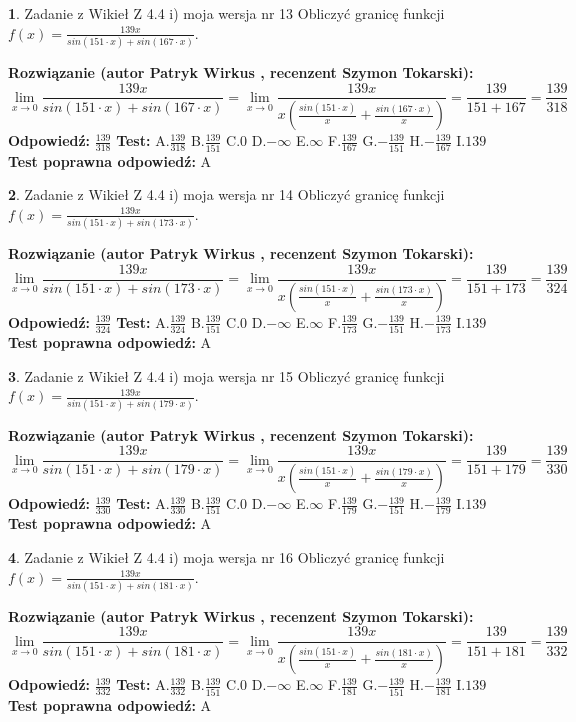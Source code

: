 \documentclass[12pt, a4paper]{article}
\theoremstyle{definition} %
\newtheorem{zad}{}
\newcommand{\zadStart}[1]{\begin{zad}#1\newline}
\newcommand{\zadStop}{\end{zad}}
\newcommand{\rozwStart}[2]{\noindent \textbf{Rozwiązanie (autor #1 , recenzent #2): }\newline}
\newcommand{\rozwStop}{\newline}
\newcommand{\odpStart}{\noindent \textbf{Odpowiedź:}\newline}
\newcommand{\odpStop}{\newline}
\newcommand{\testStart}{\noindent \textbf{Test:}\newline}
\newcommand{\testStop}{\newline}
\newcommand{\kluczStart}{\noindent \textbf{Test poprawna odpowiedź:}\newline}
\newcommand{\kluczStop}{\newline}
\begin{document}
\zadStart{Zadanie z Wikieł Z 4.4 i) moja wersja nr 13}
Obliczyć granicę funkcji $f(x)=\frac{139x}{sin(151\cdot x) +sin(167\cdot x)}$.
\zadStop
\rozwStart{Patryk Wirkus}{Szymon Tokarski}
$$\lim\limits_{x\to 0}\frac{139x}{sin(151\cdot x) +sin(167\cdot x)}=\lim\limits_{x\to 0}\frac{139x}{x(\frac{sin(151\cdot x)}{x}+\frac{sin(167\cdot x)}{x})}=\frac{139}{151+167} = \frac{139}{318}$$
\rozwStop
\odpStart
$\frac{139}{318}$
\odpStop
\testStart
A.$\frac{139}{318}$
B.$\frac{139}{151}$
C.$0$
D.$-\infty$
E.$\infty$
F.$\frac{139}{167}$
G.$-\frac{139}{151}$
H.$-\frac{139}{167}$
I.$139$
\testStop
\kluczStart
A
\kluczStop



\zadStart{Zadanie z Wikieł Z 4.4 i) moja wersja nr 14}
Obliczyć granicę funkcji $f(x)=\frac{139x}{sin(151\cdot x) +sin(173\cdot x)}$.
\zadStop
\rozwStart{Patryk Wirkus}{Szymon Tokarski}
$$\lim\limits_{x\to 0}\frac{139x}{sin(151\cdot x) +sin(173\cdot x)}=\lim\limits_{x\to 0}\frac{139x}{x(\frac{sin(151\cdot x)}{x}+\frac{sin(173\cdot x)}{x})}=\frac{139}{151+173} = \frac{139}{324}$$
\rozwStop
\odpStart
$\frac{139}{324}$
\odpStop
\testStart
A.$\frac{139}{324}$
B.$\frac{139}{151}$
C.$0$
D.$-\infty$
E.$\infty$
F.$\frac{139}{173}$
G.$-\frac{139}{151}$
H.$-\frac{139}{173}$
I.$139$
\testStop
\kluczStart
A
\kluczStop



\zadStart{Zadanie z Wikieł Z 4.4 i) moja wersja nr 15}
Obliczyć granicę funkcji $f(x)=\frac{139x}{sin(151\cdot x) +sin(179\cdot x)}$.
\zadStop
\rozwStart{Patryk Wirkus}{Szymon Tokarski}
$$\lim\limits_{x\to 0}\frac{139x}{sin(151\cdot x) +sin(179\cdot x)}=\lim\limits_{x\to 0}\frac{139x}{x(\frac{sin(151\cdot x)}{x}+\frac{sin(179\cdot x)}{x})}=\frac{139}{151+179} = \frac{139}{330}$$
\rozwStop
\odpStart
$\frac{139}{330}$
\odpStop
\testStart
A.$\frac{139}{330}$
B.$\frac{139}{151}$
C.$0$
D.$-\infty$
E.$\infty$
F.$\frac{139}{179}$
G.$-\frac{139}{151}$
H.$-\frac{139}{179}$
I.$139$
\testStop
\kluczStart
A
\kluczStop



\zadStart{Zadanie z Wikieł Z 4.4 i) moja wersja nr 16}
Obliczyć granicę funkcji $f(x)=\frac{139x}{sin(151\cdot x) +sin(181\cdot x)}$.
\zadStop
\rozwStart{Patryk Wirkus}{Szymon Tokarski}
$$\lim\limits_{x\to 0}\frac{139x}{sin(151\cdot x) +sin(181\cdot x)}=\lim\limits_{x\to 0}\frac{139x}{x(\frac{sin(151\cdot x)}{x}+\frac{sin(181\cdot x)}{x})}=\frac{139}{151+181} = \frac{139}{332}$$
\rozwStop
\odpStart
$\frac{139}{332}$
\odpStop
\testStart
A.$\frac{139}{332}$
B.$\frac{139}{151}$
C.$0$
D.$-\infty$
E.$\infty$
F.$\frac{139}{181}$
G.$-\frac{139}{151}$
H.$-\frac{139}{181}$
I.$139$
\testStop
\kluczStart
A
\kluczStop
\end{document}
